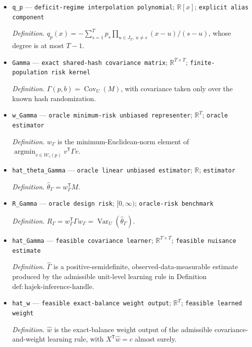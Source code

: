 \documentclass{article}
\begin{document}
\begin{itemize}
  \item \texttt{q\_\allowbreak{}p} --- \texttt{deficit-\allowbreak{}regime interpolation polynomial}; \(\mathbb R[x]\); \texttt{explicit alias component}
  \par\smallskip\noindent\emph{Definition.} \(q_p(x)=-\sum_{s=1}^{T}p_s\prod_{u\in J_T,\ u\ne s}(x-u)/(s-u)\), whose degree is at most \(T-1\).
  \item \texttt{Gamma} --- \texttt{exact shared-\allowbreak{}hash covariance matrix}; \(\mathbb R^{T\times T}\); \texttt{finite-\allowbreak{}population risk kernel}
  \par\smallskip\noindent\emph{Definition.} \(\Gamma(p,b)=\operatorname{Cov}_U(M)\), with covariance taken only over the known hash randomization.
  \item \texttt{w\_\allowbreak{}Gamma} --- \texttt{oracle minimum-\allowbreak{}risk unbiased representer}; \(\mathbb R^T\); \texttt{oracle estimator}
  \par\smallskip\noindent\emph{Definition.} \(w_\Gamma\) is the minimum-Euclidean-norm element of \(\operatorname*{argmin}_{v\in\mathcal W_c(p)}v^{\mathsf T}\Gamma v\).
  \item \texttt{hat\_\allowbreak{}theta\_\allowbreak{}Gamma} --- \texttt{oracle linear unbiased estimator}; \(\mathbb R\); \texttt{estimator}
  \par\smallskip\noindent\emph{Definition.} \(\widehat\theta_\Gamma=w_\Gamma^{\mathsf T}M\).
  \item \texttt{R\_\allowbreak{}Gamma} --- \texttt{oracle design risk}; \([0,\infty)\); \texttt{oracle-\allowbreak{}risk benchmark}
  \par\smallskip\noindent\emph{Definition.} \(R_\Gamma=w_\Gamma^{\mathsf T}\Gamma w_\Gamma=\operatorname{Var}_U(\widehat\theta_\Gamma)\).
  \item \texttt{hat\_\allowbreak{}Gamma} --- \texttt{feasible covariance learner}; \(\mathbb R^{T\times T}\); \texttt{feasible nuisance estimate}
  \par\smallskip\noindent\emph{Definition.} \(\widehat\Gamma\) is a positive-semidefinite, observed-data-measurable estimate produced by the admissible unit-level learning rule in Definition \(\mathrm{def:hajek\text{-}inference\text{-}handle}\).
  \item \texttt{hat\_\allowbreak{}w} --- \texttt{feasible exact-\allowbreak{}balance weight output}; \(\mathbb R^T\); \texttt{feasible learned weight}
  \par\smallskip\noindent\emph{Definition.} \(\widehat w\) is the exact-balance weight output of the admissible covariance-and-weight learning rule, with \(X^{\mathsf T}\widehat w=c\) almost surely.

\end{itemize}
\end{document}
